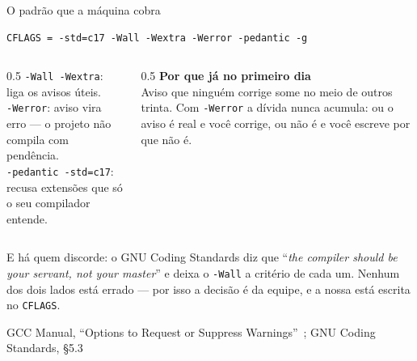\documentclass[aspectratio=169]{beamer}
\newcommand{\fonte}[1]{\vfill\hfill{\scriptsize\textcolor{UFSGray}{#1}}}
\begin{document}
\begin{frame}[fragile]{O padrão que a máquina cobra}
\begin{lstlisting}[style=makeStyle]
CFLAGS = -std=c17 -Wall -Wextra -Werror -pedantic -g
\end{lstlisting}
  \begin{columns}[T]
    \begin{column}{0.5\textwidth}
      \small
      \texttt{-Wall -Wextra}: liga os avisos úteis.\\[0.3em]
      \texttt{-Werror}: aviso vira erro --- o projeto não compila com
      pendência.\\[0.3em]
      \texttt{-pedantic -std=c17}: recusa extensões que só o seu compilador
      entende.
    \end{column}
    \begin{column}{0.5\textwidth}
      \small \textbf{Por que já no primeiro dia}\\
      Aviso que ninguém corrige some no meio de outros trinta. Com
      \texttt{-Werror} a dívida nunca acumula: ou o aviso é real e você
      corrige, ou não é e você escreve por que não é.
    \end{column}
  \end{columns}
  \begin{block}{}
    \small E há quem discorde: o GNU Coding Standards diz que
    ``\emph{the compiler should be your servant, not your master}'' e deixa
    o \texttt{-Wall} a critério de cada um. Nenhum dos dois lados está
    errado --- por isso a decisão é da equipe, e a nossa está escrita no
    \texttt{CFLAGS}.
  \end{block}
  \fonte{GCC Manual, ``Options to Request or Suppress Warnings''~\cite{gcc2024warnings};
    GNU Coding Standards, §5.3~\cite{gnu2024standards}}
\end{frame}
\end{document}
